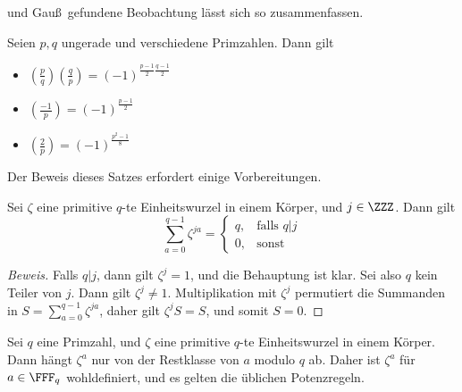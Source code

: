 \documentclass[12pt,a4paper,twoside]{article}
\begin{document}
und Gau\ss\ gefundene Beobachtung l\"asst sich so zusammenfassen.
\begin{Satz}
  Seien $p,q$ ungerade und verschiedene Primzahlen. Dann gilt
  \begin{itemize}
  \item[(a)] $\left(\frac{p}{q}\right)\left(\frac{q}{p}\right)=
    (-1)^{\frac{p-1}{2}\frac{q-1}{2}}$
  \item[(b)] $\left(\frac{-1}{p}\right)=(-1)^{\frac{p-1}{2}}$
  \item[(c)] $\left(\frac{2}{p}\right)=(-1)^{\frac{p^2-1}{8}}$
  \end{itemize}
\end{Satz}
Der Beweis dieses Satzes erfordert einige Vorbereitungen.
\begin{Lemma}
  Sei $\zeta$ eine primitive $q$-te Einheitswurzel in einem K\"orper, und
  $j\in\ZZZ$. Dann gilt
\[
\sum_{a=0}^{q-1}\zeta^{ja}=
\begin{cases}
  q, & \text{falls $q|j$}\\
0, & \text{sonst}
\end{cases}
\]
\end{Lemma}
\begin{proof}[Beweis]
  Falls $q|j$, dann gilt $\zeta^j=1$, und die Behauptung ist klar. Sei also
  $q$ kein Teiler von $j$. Dann gilt $\zeta^j\ne1$. Multiplikation mit
  $\zeta^j$ permutiert die Summanden in $S=\sum_{a=0}^{q-1}\zeta^{ja}$, daher
  gilt $\zeta^jS=S$, und somit $S=0$.
\end{proof}
Sei $q$ eine Primzahl, und $\zeta$ eine primitive $q$-te Einheitswurzel in
einem K\"orper. Dann h\"angt $\zeta^a$ nur von der Restklasse von $a$ modulo
$q$ ab. Daher ist $\zeta^a$ f\"ur $a\in\FFF_q$ wohldefiniert, und es gelten
die \"ublichen Potenzregeln.
\end{document}
